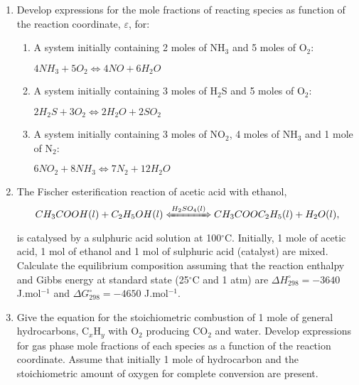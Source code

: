 \documentclass[12pts,a4paper,amsmath,amssymb,floatfix]{article}%
\begin{document}
\begin{enumerate}[label=\bfseries Problem \arabic*:]

\item\label{T08E01}Develop expressions for the mole fractions of reacting species as function of the reaction coordinate, $\varepsilon$, for:
\begin{enumerate}
\item A system initially containing 2 moles of NH$_{3}$ and 5 moles of O$_{2}$:
\begin{center}
$4 NH_{3} + 5 O_{2} \Longleftrightarrow 4 NO + 6 H_{2}O$
\end{center}
\item A system initially containing 3 moles of H$_{2}$S and 5 moles of O$_{2}$:
\begin{center}
$2 H_{2}S + 3 O_{2} \Longleftrightarrow 2 H_{2}O + 2 SO_{2}$
\end{center}
\item A system initially containing 3 moles of NO$_{2}$, 4 moles of NH$_{3}$ and 1 mole of N$_{2}$:
\begin{center}
$6 NO_{2} + 8 NH_{3} \Longleftrightarrow 7 N_{2} + 12 H_{2}O$
\end{center}
\end{enumerate}

\item\label{LectExample} The Fischer esterification reaction of acetic acid with ethanol,
\begin{displaymath}
CH_{3}COOH (l) + C_{2}H_{5}OH (l)  \xLeftrightarrow[]{H_{2}SO_{4} (l)} CH_{3}COOC_{2}H_{5} (l) + H_{2}O (l),
\end{displaymath}
is catalysed by a sulphuric acid solution  at 100$^{\circ}$C. Initially, 1 mole of acetic acid, 1 mol of ethanol and 1 mol of sulphuric acid (catalyst) are mixed. Calculate the equilibrium composition assuming that the reaction enthalpy and Gibbs energy at standard state (25$^{\circ}$C and 1 atm) are $\Delta H_{298}^{\circ}=-3640$ J.mol$^{-1}$ and $\Delta G_{298}^{\circ}=-4650$ J.mol$^{-1}$.

\item\label{T0802} Give the equation for the stoichiometric combustion of 1 mole of general hydrocarbons, C$_{x}$H$_{y}$ with O$_{2}$ producing CO$_{2}$ and water. Develop expressions for gas phase mole fractions of each species as a function of the reaction coordinate. Assume that initially 1 mole of hydrocarbon and the stoichiometric amount of oxygen for complete conversion are present. 


\end{enumerate}
\end{document}
